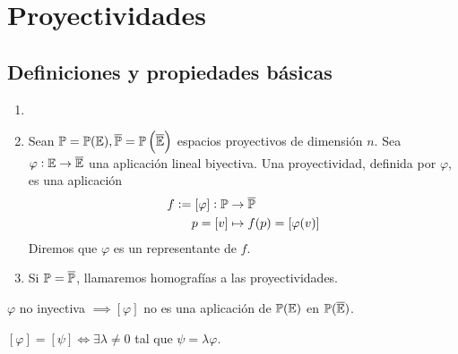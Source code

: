 \chapter{Proyectividades}
\section{Definiciones y propiedades básicas}

\begin{defi}
    \begin{enumerate}
        \item[]
        \item Sean $\mathbb{P} = \mathbb{P}(\mathbb{E}), \overline{\mathbb{P}} = \mathbb{P}\left(\overline{\mathbb{E}}\right)$ espacios proyectivos de dimensión $n$. Sea $\varphi : \mathbb{E} \to \overline{\mathbb{E}}$ una aplicación lineal biyectiva. Una proyectividad, definida por $\varphi$, es una aplicación
        \begin{align*}
            f := [\varphi] : \mathbb{P} &\to \overline{\mathbb{P}} \\
            p = [v] &\mapsto f(p) = [\varphi(v)]
        \end{align*}
        Diremos que $\varphi$ es un representante de $f$.
        \item Si $\mathbb{P} = \overline{\mathbb{P}}$, llamaremos homografías a las proyectividades.
    \end{enumerate}
\end{defi}
\begin{obs}
    $\varphi$ no inyectiva $\implies [\varphi]$ no es una aplicación de $\mathbb{P}(\mathbb{E})$ 
    en $\mathbb{P}(\overline{\mathbb{E}})$.
\end{obs}
\begin{obs}
    $[\varphi] = [\psi] \iff \exists \lambda \neq 0$ tal que $\psi = \lambda \varphi$.
\end{obs}
